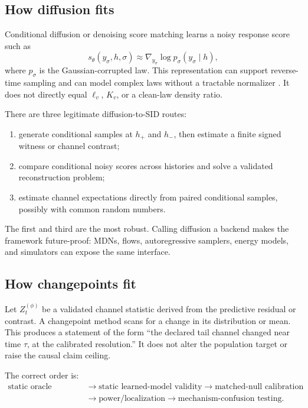 \documentclass[10pt]{article}
\begin{document}
\subsection{How diffusion fits}

Conditional diffusion or denoising score matching learns a noisy response score such as
\[
  s_\theta(y_\sigma,h,\sigma)
  \approx \nabla_{y_\sigma}\log p_\sigma(y_\sigma\mid h),
\]
where \(p_\sigma\) is the Gaussian-corrupted law. This representation can support reverse-time sampling and can model complex laws without a tractable normalizer \cite{vincent2011,song2021}. It does not directly equal \(\ell_v\), \(K_v\), or a clean-law density ratio.

There are three legitimate diffusion-to-SID routes:

\begin{enumerate}
  \item generate conditional samples at \(h_+\) and \(h_-\), then estimate a finite signed witness or channel contrast;
  \item compare conditional noisy scores across histories and solve a validated reconstruction problem;
  \item estimate channel expectations directly from paired conditional samples, possibly with common random numbers.
\end{enumerate}

The first and third are the most robust. Calling diffusion a backend makes the framework future-proof: MDNs, flows, autoregressive samplers, energy models, and simulators can expose the same interface.

\subsection{How changepoints fit}

Let \(Z_t^{(\phi)}\) be a validated channel statistic derived from the predictive residual or contrast. A changepoint method scans for a change in its distribution or mean. This produces a statement of the form ``the declared tail channel changed near time \(\tau\), at the calibrated resolution.'' It does not alter the population target or raise the causal claim ceiling.

The correct order is:
\[
\begin{aligned}
  \text{static oracle validity}
  &\to \text{static learned-model validity}
  \to \text{matched-null calibration}\\
  &\to \text{power/localization}
  \to \text{mechanism-confusion testing}.
\end{aligned}
\]
\end{document}
